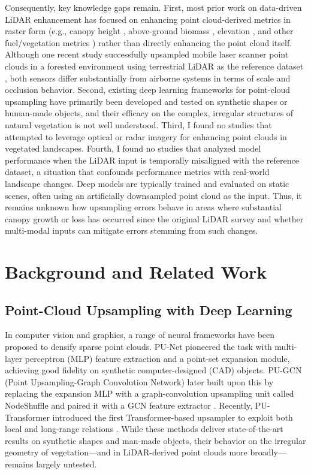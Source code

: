 \documentclass[12pt]{report}
\begin{document}
Consequently, key knowledge gaps remain. First, most prior work on data-driven LiDAR enhancement has focused on enhancing point cloud-derived metrics in raster form (e.g., canopy height \citep{wilkes_mapping_2015, wagner_sub-meter_2024}, above-ground biomass \citep{shendryk2022fusing}, elevation \citep{li2023large}, and other fuel/vegetation metrics \citep{taneja2023up, gazzea2023high}) rather than directly enhancing the point cloud itself. Although one recent study successfully upsampled mobile laser scanner point clouds in a forested environment using terrestrial LiDAR as the reference dataset \citep{remijnse2024upsampling}, both sensors differ substantially from airborne systems in terms of scale and occlusion behavior. Second, existing deep learning frameworks for point-cloud upsampling have primarily been developed and tested on synthetic shapes or human-made objects, and their efficacy on the complex, irregular structures of natural vegetation is not well understood. Third, I found no studies that attempted to leverage optical or radar imagery for enhancing point clouds in vegetated landscapes. Fourth, I found no studies that analyzed model performance when the LiDAR input is temporally misaligned with the reference dataset, a situation that confounds performance metrics with real-world landscape changes. Deep models are typically trained and evaluated on static scenes, often using an artificially downsampled point cloud as the input. Thus, it remains unknown how upsampling errors behave in areas where substantial canopy growth or loss has occurred since the original LiDAR survey and whether multi-modal inputs can mitigate errors stemming from such changes.

\section{Background and Related Work}

\subsection{Point-Cloud Upsampling with Deep Learning}

In computer vision and graphics, a range of neural frameworks have been proposed to densify sparse point clouds. PU-Net \citep{yu2018pu} pioneered the task with multi-layer perceptron (MLP) feature extraction and a point-set expansion module, achieving good fidelity on synthetic computer-designed (CAD) objects. PU-GCN (Point Upsampling-Graph Convolution Network) later built upon this by replacing the expansion MLP with a graph-convolution upsampling unit called NodeShuffle and paired it with a GCN feature extractor \citep{qian2021pu}. Recently, PU-Transformer introduced the first Transformer-based upsampler to exploit both local and long-range relations \citep{qiu2022pu}. While these methods deliver state-of-the-art results on synthetic shapes and man-made objects, their behavior on the irregular geometry of vegetation—and in LiDAR-derived point clouds more broadly—remains largely untested.
\end{document}
